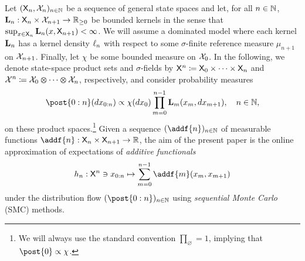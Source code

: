 Let $(\mathsf{X}_n, \mathcal{X}_n)_{n \in \mathbb{N}}$ be a sequence of general state spaces and let, for all $n \in \mathbb{N}$, $\mathbf{L}_{n} : \mathsf{X}_n \times \mathcal{X}_{n + 1} \to \mathbb{R}_{\geq 0}$ be bounded kernels in the sense that $\sup_{x \in \mathsf{X}_n} \mathbf{L}_{n}(x, \mathsf{X}_{n + 1}) < \infty$. We will assume a dominated model where each kernel $\mathbf{L}_{n}$ has a kernel density $\ell_{n}$ with respect to some $\sigma$-finite reference measure $\mu_{n + 1}$ on $\mathcal{X}_{n + 1}$. Finally, let $\chi$ be some bounded measure on $\mathcal{X}_0$. In the following, we denote state-space product sets and $\sigma$-fields by $\mathsf{X}^n \coloneqq \mathsf{X}_0 \times \cdots \times \mathsf{X}_n$ and $\mathcal{X}^n \coloneqq \mathcal{X}_0 \varotimes \cdots \varotimes \mathcal{X}_n$, respectively, and consider probability measures  
\begin{equation} \label{eq:def:post}
\post{0:n}(\rmd x_{0:n}) \propto \chi(\rmd x_0) \prod_{m = 0}^{n - 1} \uk{m}(x_m, \rmd x_{m + 1}), \quad n \in \nset, 
\end{equation}
on these product spaces.\footnote{We will always use the standard convention $\prod_{\varnothing} = 1$, implying that $\post{0} \propto \chi$.} Given a sequence $(\addf{n})_{n \in \nset}$ of measurable functions $\addf{n} : \Xset_n \times \Xset_{n + 1} \to \rset$, the aim of the present paper is the online approximation of expectations of \emph{additive functionals}   
\begin{equation} \label{eq:add:func}
    h_n : \Xset^n \ni x_{0:n} \mapsto \sum_{m = 0}^{n - 1} \addf{m}(x_m, x_{m + 1})
\end{equation}
under the distribution flow $(\post{0:n})_{n \in \nset}$ using \emph{sequential Monte Carlo} (SMC) methods. 

